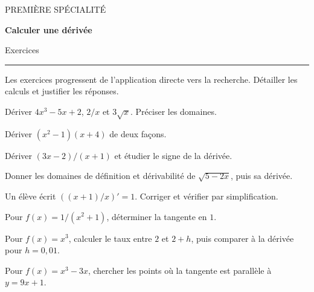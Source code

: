 \documentclass[11pt,a4paper]{article}
\begin{document}
{\small\color{Blue}PREMIÈRE SPÉCIALITÉ}\par{\LARGE\bfseries Calculer une dérivée}\par{\large Exercices}\par\vspace{0.2cm}\hrule\vspace{0.4cm}
Les exercices progressent de l’application directe vers la recherche. Détailler les calculs et justifier les réponses.
\par\noindent\begin{minipage}{\linewidth}
Dériver $4x^3-5x+2$, $2/x$ et $3\sqrt{x}$. Préciser les domaines.
\end{minipage}\par
\par\noindent\begin{minipage}{\linewidth}
Dériver $(x^2-1)(x+4)$ de deux façons.
\end{minipage}\par
\par\noindent\begin{minipage}{\linewidth}
Dériver $(3x-2)/(x+1)$ et étudier le signe de la dérivée.
\end{minipage}\par
\par\noindent\begin{minipage}{\linewidth}
Donner les domaines de définition et dérivabilité de $\sqrt{5-2x}$, puis sa dérivée.
\end{minipage}\par
\par\noindent\begin{minipage}{\linewidth}
Un élève écrit $((x+1)/x)\prime=1$. Corriger et vérifier par simplification.
\end{minipage}\par
\par\noindent\begin{minipage}{\linewidth}
Pour $f(x)=1/(x^2+1)$, déterminer la tangente en $1$.
\end{minipage}\par
\par\noindent\begin{minipage}{\linewidth}
Pour $f(x)=x^3$, calculer le taux entre $2$ et $2+h$, puis comparer à la dérivée pour $h=0,01$.
\end{minipage}\par
\par\noindent\begin{minipage}{\linewidth}
Pour $f(x)=x^3-3x$, chercher les points où la tangente est parallèle à $y=9x+1$.
\end{minipage}\par
\end{document}
